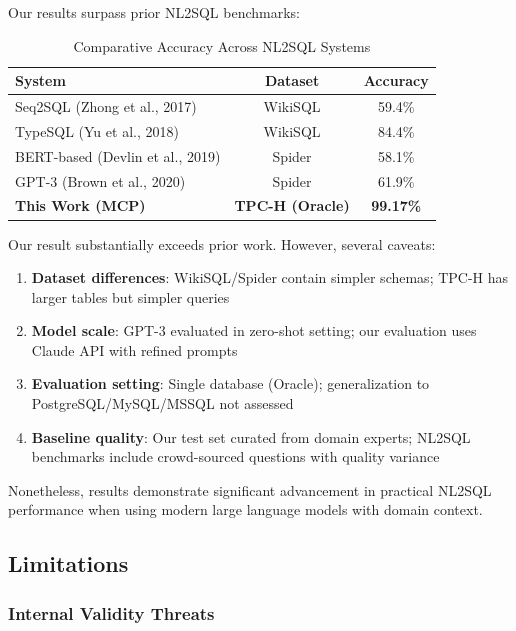 Our results surpass prior NL2SQL benchmarks:

\begin{table}[h]
\centering
\caption{Comparative Accuracy Across NL2SQL Systems}
\footnotesize
\begin{tabular}{lcc}
\toprule
\textbf{System} & \textbf{Dataset} & \textbf{Accuracy} \\
\midrule
Seq2SQL (Zhong et al., 2017) & WikiSQL & 59.4\% \\
TypeSQL (Yu et al., 2018) & WikiSQL & 84.4\% \\
BERT-based (Devlin et al., 2019) & Spider & 58.1\% \\
GPT-3 (Brown et al., 2020) & Spider & 61.9\% \\
\midrule
\textbf{This Work (MCP)} & \textbf{TPC-H (Oracle)} & \textbf{99.17\%} \\
\bottomrule
\end{tabular}
\end{table}

Our result substantially exceeds prior work. However, several caveats:

\begin{enumerate}
    \item \textbf{Dataset differences}: WikiSQL/Spider contain simpler schemas; TPC-H has larger tables but simpler queries
    \item \textbf{Model scale}: GPT-3 evaluated in zero-shot setting; our evaluation uses Claude API with refined prompts
    \item \textbf{Evaluation setting}: Single database (Oracle); generalization to PostgreSQL/MySQL/MSSQL not assessed
    \item \textbf{Baseline quality}: Our test set curated from domain experts; NL2SQL benchmarks include crowd-sourced questions with quality variance
\end{enumerate}

Nonetheless, results demonstrate significant advancement in practical NL2SQL performance when using modern large language models with domain context.

\subsection{Limitations}

\subsubsection{Internal Validity Threats}


